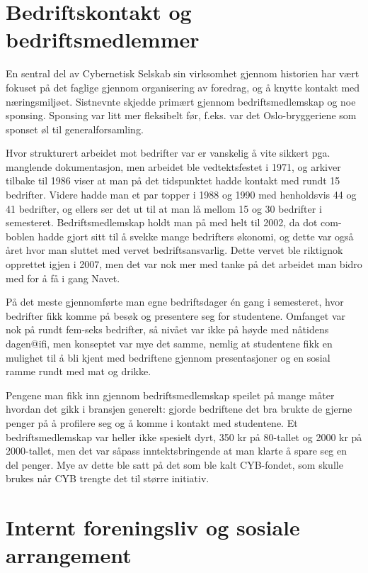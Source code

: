 \section{Bedriftskontakt og bedriftsmedlemmer}

En sentral del av Cybernetisk Selskab sin virksomhet gjennom historien har vært fokuset på det faglige gjennom organisering av foredrag, og å knytte kontakt med næringsmiljøet. Sistnevnte skjedde primært gjennom bedriftsmedlemskap og noe sponsing. Sponsing var litt mer fleksibelt før, f.eks. var det Oslo-bryggeriene som sponset øl til generalforsamling.

Hvor strukturert arbeidet mot bedrifter var er vanskelig å vite sikkert pga. manglende dokumentasjon, men arbeidet ble vedtektsfestet i 1971, og arkiver tilbake til 1986 viser at man på det tidspunktet hadde kontakt med rundt 15 bedrifter. Videre hadde man et par topper i 1988 og 1990 med henholdsvis 44 og 41 bedrifter, og ellers ser det ut til at man lå mellom 15 og 30 bedrifter i semesteret. Bedriftsmedlemskap holdt man på med helt til 2002, da dot com-boblen hadde gjort sitt til å svekke mange bedrifters økonomi, og dette var også året hvor man sluttet med vervet bedriftsansvarlig. Dette vervet ble riktignok opprettet igjen i 2007, men det var nok mer med tanke på det arbeidet man bidro med for å få i gang Navet.

På det meste gjennomførte man egne bedriftsdager én gang i semesteret, hvor bedrifter fikk komme på besøk og presentere seg for studentene. Omfanget var nok på rundt fem-seks bedrifter, så nivået var ikke på høyde med nåtidens dagen@ifi, men konseptet var mye det samme, nemlig at studentene fikk en mulighet til å bli kjent med bedriftene gjennom presentasjoner og en sosial ramme rundt med mat og drikke.

Pengene man fikk inn gjennom bedriftsmedlemskap speilet på mange måter hvordan det gikk i bransjen generelt: gjorde bedriftene det bra brukte de gjerne penger på å profilere seg og å komme i kontakt med studentene. Et bedriftsmedlemskap var heller ikke spesielt dyrt, 350 kr på 80-tallet og 2000 kr på 2000-tallet, men det var såpass inntektsbringende at man klarte å spare seg en del penger. Mye av dette ble satt på det som ble kalt CYB-fondet, som skulle brukes når CYB trengte det til større initiativ.

\section{Internt foreningsliv og sosiale arrangement}

